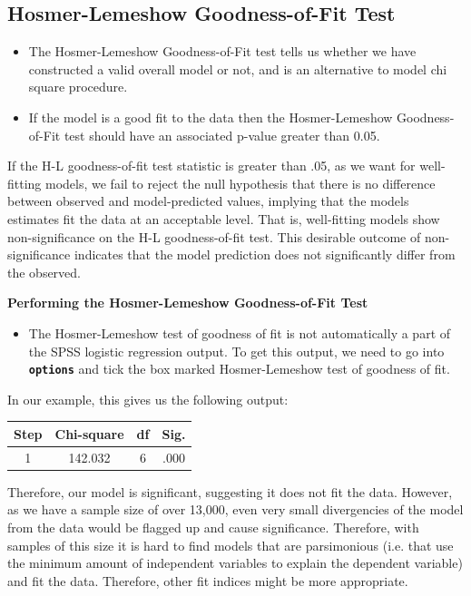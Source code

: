 \documentclass[a4paper,12pt]{article}
\begin{document}
\subsection{Hosmer-Lemeshow Goodness-of-Fit Test}
\begin{framed}
\begin{itemize}
	\item The Hosmer-Lemeshow Goodness-of-Fit
	test tells us whether we have constructed a valid overall model or not, and is an alternative to model chi square procedure.
	\item If the model is a good fit to the data then the Hosmer-Lemeshow Goodness-of-Fit test should have an associated p-value greater than 0.05.
\end{itemize} 
\end{framed}
If the H-L goodness-of-fit test statistic is greater than .05, as we want for well-fitting models, we fail to reject the null hypothesis that there is no difference between observed and model-predicted values, implying that the models estimates fit the data at an acceptable level. That is, well-fitting models show non-significance on the
H-L goodness-of-fit test. This desirable outcome of non-significance indicates that the
model prediction does not significantly differ from the observed.

\noindent \textbf{Performing the Hosmer-Lemeshow Goodness-of-Fit Test} 	
\begin{itemize}	
\item 	
	The Hosmer-Lemeshow test of goodness of fit is not automatically a part of the SPSS logistic regression output. 
	To get this output, we need to go into \textbf{\texttt{options}} and tick the box marked Hosmer-Lemeshow test of goodness of fit. 
\end{itemize}



In our example, this gives us the following output:

\begin{center}
	\begin{tabular}{|c|c|c|c|}
		\hline  Step	& Chi-square&	df 	 & Sig. \\ \hline
		1	 & 142.032	& 6	 &.000 \\ 
		\hline 
	\end{tabular} 
\end{center}


Therefore, our model is significant, suggesting it does not fit the data. However, as we have a sample size of over 13,000, even very small divergencies of the model from the data would be flagged up and cause significance. Therefore, with samples of this size it is hard to find models that are parsimonious (i.e. that use the minimum amount of independent variables to explain the dependent variable) and fit the data. Therefore, other fit indices might be more appropriate.\\
\end{document}
